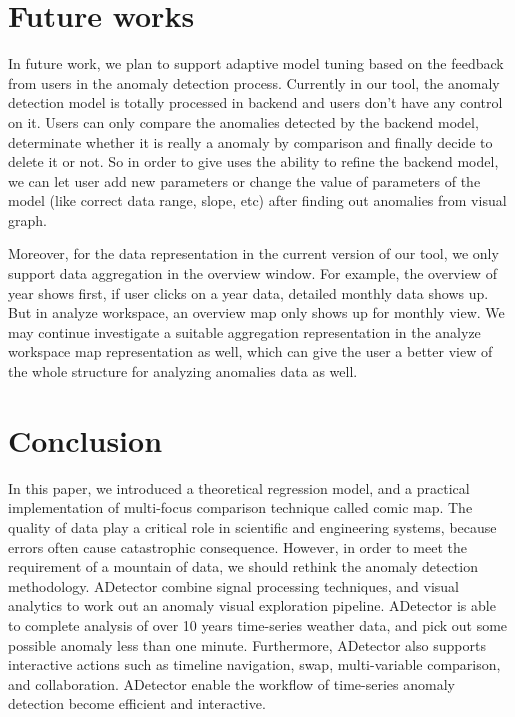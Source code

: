 \documentclass{vgtc}                          %
\begin{document}
\section{Future works}

In future work, we plan to support adaptive model tuning based on the feedback from users in the anomaly detection process. Currently in our tool, the anomaly detection model is totally processed in backend and users don’t have any control on it. Users can only compare the anomalies detected by the backend model, determinate whether it is really a anomaly by comparison and finally decide to delete it or not. So in order to give uses the ability to refine the backend model, we can let user add new parameters or change the value of parameters of the model (like correct data range, slope, etc) after finding out anomalies from visual graph.

      Moreover, for the data representation in the current version of our tool, we only support data aggregation in the overview window. For example, the overview of year shows first, if user clicks on a year data, detailed monthly data shows up. But in analyze workspace, an overview map only shows up for monthly view.  We may continue investigate a suitable aggregation representation in the analyze workspace map representation as well, which can give the user a better view of the whole structure for analyzing anomalies data as well.  
\section{Conclusion}

In this paper, we introduced a theoretical regression model, and a practical implementation of multi-focus comparison technique called comic map. The quality of data play a critical role in scientific and engineering systems, because errors often cause catastrophic consequence. However, in order to meet the requirement of a mountain of data, we should rethink the anomaly detection methodology. ADetector combine signal processing techniques, and visual analytics to work out an anomaly visual exploration pipeline. ADetector is able to complete analysis of over 10 years time-series weather data, and pick out some possible anomaly less than one minute. Furthermore, ADetector also supports interactive actions such as timeline navigation, swap, multi-variable comparison, and collaboration. ADetector enable the workflow of time-series anomaly detection become efficient and interactive.





\end{document}

